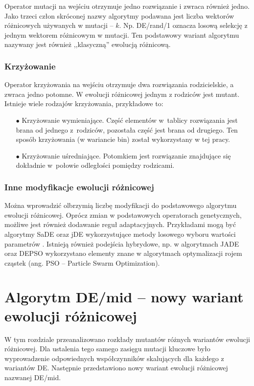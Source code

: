 \documentclass[a4paper,onecolumn,oneside,12pt,wide,floatssmall]{mwrep}
\theoremstyle{definition}
\theoremstyle{plain}%
\theoremstyle{remark}
\begin{document}
Operator mutacji na wejściu otrzymuje jedno rozwiązanie i zwraca również jedno.
Jako trzeci człon skróconej nazwy algorytmy
podawana jest liczba wektorów różnicowych używanych w mutacji -- $k$.
Np. DE/rand/1 oznacza losową selekcję z jednym wektorem różnicowym w mutacji.
Ten podstawowy wariant algorytmu nazywany jest również ,,klasyczną'' ewolucją różnicową. 

\subsection{Krzyżowanie}

Operator krzyżowania na wejściu otrzymuje dwa rozwiązania rodzicielskie, a zwraca jedno potomne. 
W ewolucji różnicowej jednym z rodziców jest mutant. Istnieje wiele rodzajów krzyżowania, 
przykładowe to:
\begin{itemize} 
 \item[$\bullet$]  Krzyżowanie wymieniające. 
Część elementów w tablicy rozwiązania jest brana od jednego z rodziców, 
pozostała część jest brana od drugiego. Ten sposób krzyżowania (w wariancie bin)
został wykorzystany w tej pracy.
 \item[$\bullet$] Krzyżowanie uśredniające. 
Potomkiem jest rozwiązanie znajdujące się dokładnie w~połowie odległości pomiędzy rodzicami.
\end{itemize} 

\subsection{Inne modyfikacje ewolucji różnicowej}

Można wprowadzić olbrzymią liczbę modyfikacji do podstawowego algorytmu ewolucji różnicowej.
Oprócz zmian w podstawowych operatorach genetycznych, możliwe jest również dodawanie reguł adaptacyjnych.
Przykładami mogą być algorytmy SaDE oraz jDE wykorzystujące metody losowego wyboru
wartości parametrów \cite{brest}. Istnieją również podejścia hybrydowe, np. w algorytmach JADE \cite{jade} oraz 
DEPSO \cite{depso} wykorzystano elementy znane w algorytmach optymalizacji rojem cząstek (ang. PSO -- Particle Swarm Optimization).

\chapter{Algorytm DE/mid -- nowy wariant ewolucji różnicowej}

W tym rozdziale przeanalizowano rozkłady mutantów różnych wariantów ewolucji różnicowej.
Dla ustalenia tego samego zasięgu mutacji kluczowe było wyprowadzenie odpowiednych współczynników skalujących
dla każdego z wariantów DE. Następnie przedstawiono nowy wariant ewolucji różnicowej nazwanej DE/mid.
\end{document}
